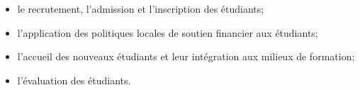 \documentclass [12 pt]{article}
\begin{document}
        \begin{itemize}
        
                
        \item le recrutement, l'admission et l'inscription des étudiants;
                
        \item l'application des politiques locales de soutien financier aux étudiants;
                
        \item l'accueil des nouveaux étudiants et leur intégration aux milieux de
                    formation;
                
        \item l'évaluation des étudiants.
            
        \end{itemize}
    
\end{document}
